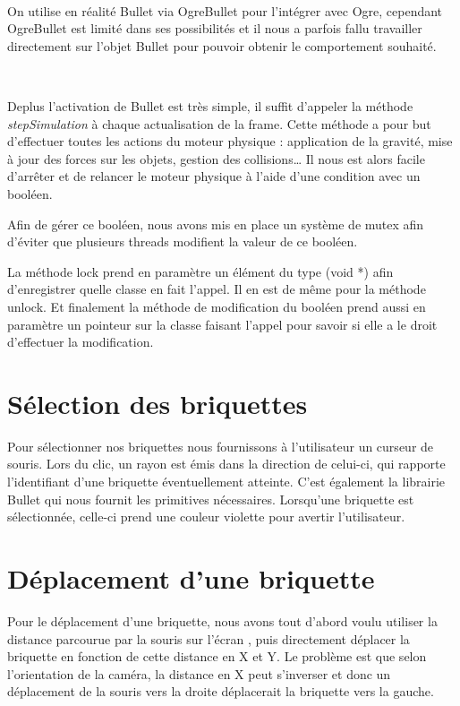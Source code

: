 \documentclass[frenchb,twoside]{EPURapport}
\begin{document}
		\
		
        On utilise en réalité Bullet via OgreBullet pour l'intégrer avec Ogre,
        cependant OgreBullet est limité dans ses possibilités et il nous a
        parfois fallu travailler directement sur l'objet Bullet pour pouvoir
        obtenir le comportement souhaité. 
        
        \
        
        Deplus l'activation de Bullet est très simple, il suffit d'appeler la
        méthode \textit{stepSimulation} à chaque actualisation de la frame.
        Cette méthode a pour but d'effectuer toutes les actions du moteur
        physique : application de la gravité, mise à jour des forces
        sur les objets, gestion des collisions\dots{} Il nous est alors facile
        d'arrêter et de relancer le moteur physique à l'aide d'une condition
        avec un booléen.
             
        Afin de gérer ce booléen, nous avons mis en place un système de mutex
        afin d'éviter que plusieurs threads modifient la valeur de ce booléen.
        
        La méthode lock prend en paramètre un élément du type (void *) afin
        d'enregistrer quelle classe en fait l'appel. Il en est de même pour
        la méthode unlock. Et finalement la méthode de modification du booléen
        prend aussi en paramètre un pointeur sur la classe faisant l'appel
        pour savoir si elle a le droit d'effectuer la modification.
        

    \section{Sélection des briquettes}
        Pour sélectionner nos briquettes nous fournissons à l'utilisateur un
        curseur de souris. Lors du clic, un rayon est émis dans la direction de
        celui-ci, qui rapporte l'identifiant d'une briquette éventuellement
        atteinte. C'est également la librairie Bullet qui nous fournit les
        primitives nécessaires. Lorsqu'une briquette est sélectionnée, celle-ci
        prend une couleur violette pour avertir l'utilisateur.
        
    \section{Déplacement d'une briquette}
        Pour le déplacement d'une briquette, nous avons tout d'abord voulu
         utiliser la distance parcourue par la souris sur l'écran
        , puis directement déplacer la briquette en fonction de cette distance en X et Y.
        Le problème est que selon l'orientation de la caméra, la distance en X
        peut s'inverser et donc un déplacement de la souris vers la droite
        déplacerait la briquette vers la gauche.
        
\end{document}
